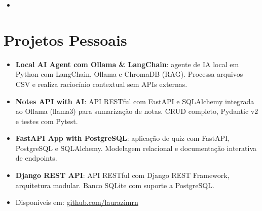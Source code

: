 \documentclass[11pt,a4paper,sans]{moderncv}
\begin{document}
\begin{itemize}
\vspace{3pt}

\item{}

\end{itemize}


\section{Projetos Pessoais}
\vspace{1pt}
\begin{itemize}

\item \textbf{Local AI Agent com Ollama \& LangChain}: agente de IA local em Python com LangChain, Ollama e ChromaDB (RAG). Processa arquivos CSV e realiza raciocínio contextual sem APIs externas.

\item \textbf{Notes API with AI}: API RESTful com FastAPI e SQLAlchemy integrada ao Ollama (llama3) para sumarização de notas. CRUD completo, Pydantic v2 e testes com Pytest.

\item \textbf{FastAPI App with PostgreSQL}: aplicação de quiz com FastAPI, PostgreSQL e SQLAlchemy. Modelagem relacional e documentação interativa de endpoints.

\item \textbf{Django REST API}: API RESTful com Django REST Framework, arquitetura modular. Banco SQLite com suporte a PostgreSQL.

\item Disponíveis em: \href{https://github.com/laurazimrn}{github.com/laurazimrn}

\end{itemize}

\end{document}
